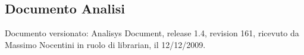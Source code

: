 \subsection{Documento Analisi}
Documento versionato: Analisys Document, release 1.4, revision 161, ricevuto da
Massimo Nocentini in ruolo di librarian, il 12/12/2009.